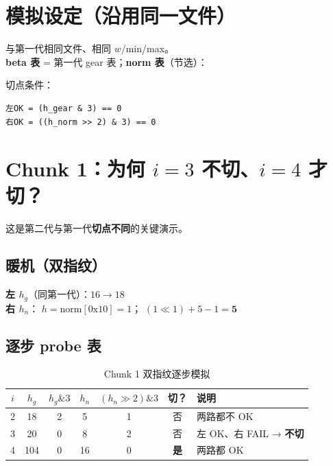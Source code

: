 
\section{模拟设定（沿用同一文件）}

\begin{simbox}[第二代额外参数]
与第一代相同文件、相同 $w$/min/max。\\
\textbf{beta 表} = 第一代 gear 表；\textbf{norm 表}（节选）：

\SimNormTab

切点条件：
\begin{lstlisting}
左OK = (h_gear & 3) == 0
右OK = ((h_norm >> 2) & 3) == 0
\end{lstlisting}
\end{simbox}

\section{Chunk 1：为何 $i=3$ 不切、$i=4$ 才切？}

这是第二代与第一代\textbf{切点不同}的关键演示。

\subsection{暖机（双指纹）}

\begin{simbox}[双路暖机]
\textbf{左 $h_g$}（同第一代）：$16 \to 18$\\[0.3em]
\textbf{右 $h_n$}：
$h = \mathrm{norm[0x10]} = 1$；
$(1 \ll 1)+5-1 = \mathbf{5}$
\end{simbox}

\subsection{逐步 probe 表}

\begin{table}[htbp]
\centering
\caption{Chunk 1 双指纹逐步模拟}
\scriptsize
\begin{tabular}{@{}ccccccl@{}}
\toprule
\textbf{$i$} & \textbf{$h_g$} & \textbf{$h_g\&3$} &
\textbf{$h_n$} & \textbf{$(h_n\!\gg\!2)\&3$} & \textbf{切？} & \textbf{说明} \\
\midrule
2 & 18 & 2 & 5  & 1 & 否 & 两路都不 OK \\
3 & 20 & \textcolor{CutRed}{0} & 8 & 2 & 否 &
左 OK、右 FAIL → \textbf{不切} \\
4 & 104 & \textcolor{CutRed}{0} & 16 & \textcolor{CutRed}{0} &
\textcolor{CutRed}{\textbf{是}} & 两路都 OK \\
\bottomrule
\end{tabular}
\end{table}

